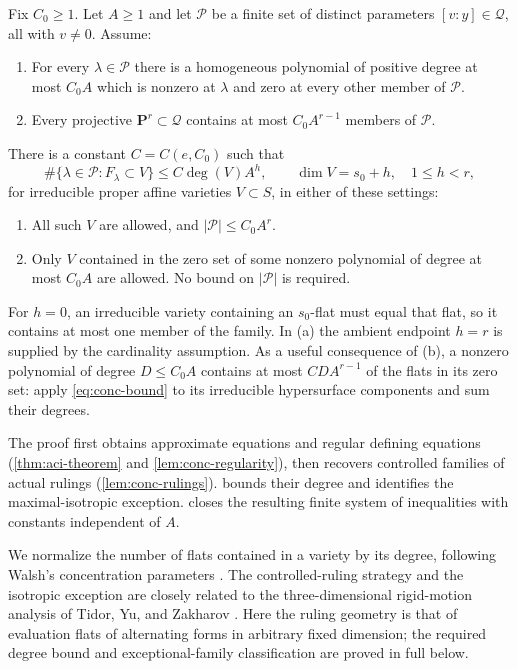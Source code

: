 \begin{theorem}
\label{thm:conc-theorem}
Fix $C_0\geq1$.  Let $A\geq1$ and let $\mathcal{P}$ be a finite set of distinct parameters $[v:y]\in\mathcal{Q}$, all with $v\ne0$.  Assume:
\begin{enumerate}
\item[(i)] For every $\lambda\in\mathcal{P}$ there is a homogeneous polynomial
      of positive degree at most $C_0A$ which is nonzero at $\lambda$ and zero at every other member of $\mathcal{P}$.
\item[(ii)] Every projective $\mathbf{P}^r\subset\mathcal{Q}$ contains at most
      $C_0A^{r-1}$ members of $\mathcal{P}$.
\end{enumerate}
There is a constant $C=C(e,C_0)$ such that
\begin{equation}
 \#\{\lambda\in\mathcal{P}:F_\lambda\subset V\}
 \leq C\deg(V)A^h,
 \qquad \dim V=s_0+h,\quad 1\leq h<r,
 \label{eq:conc-bound}
\end{equation}
for irreducible proper affine varieties $V\subset S$, in either of these settings:
\begin{enumerate}
\item[(a)] All such $V$ are allowed, and $|\mathcal{P}|\leq C_0A^r$.
\item[(b)] Only $V$ contained in the zero set of some nonzero polynomial
      of degree at most $C_0A$ are allowed.  No bound on $|\mathcal{P}|$ is required.
\end{enumerate}
\end{theorem}

For $h=0$, an irreducible variety containing an $s_0$-flat must equal that flat, so it contains at most one member of the family.  In (a) the ambient endpoint $h=r$ is supplied by the cardinality assumption.  As a useful consequence of (b), a nonzero polynomial of degree $D\leq C_0A$ contains at most $CDA^{r-1}$ of the flats in its zero set: apply \eqref{eq:conc-bound} to its irreducible hypersurface components and sum their degrees.

The proof first obtains approximate equations and regular defining equations (\cref{thm:aci-theorem} and \cref{lem:conc-regularity}), then recovers controlled families of actual rulings (\cref{lem:conc-rulings}).  bounds their degree and identifies the maximal-isotropic exception.  closes the resulting finite system of inequalities with constants independent of $A$.

We normalize the number of flats contained in a variety by its degree, following Walsh's concentration parameters \cite[Section~1.1, definition of $\mathcal{D}_m$]{walsh2023}.  The controlled-ruling strategy and the isotropic exception are closely related to the three-dimensional rigid-motion analysis of Tidor, Yu, and Zakharov \cite[Sections~5--6]{tidoryuzakharov2026}.  Here the ruling geometry is that of evaluation flats of alternating forms in arbitrary fixed dimension; the required degree bound and exceptional-family classification are proved in full below.

